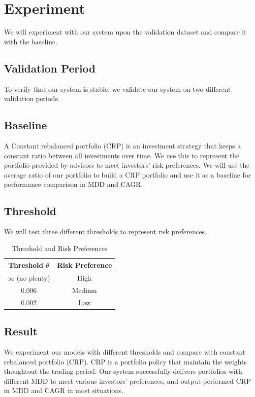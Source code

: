 \section{Experiment}
We will experiment with our system upon the validation dataset and compare it with the baseline.
\subsection{Validation Period}
To verify that our system is stable, we validate our system on two different validation periods. 
\subsection{Baseline}
A Constant rebalanced portfolio (CRP) is an investment strategy that keeps a constant ratio between all investments over time. We use this to represent the portfolio provided by advisors to meet investors' risk preferences. We will use the average ratio of our portfolio to build a CRP portfolio and use it as a baseline for performance comparison in MDD and CAGR.
\subsection{Threshold}
We will test three different thresholds to represent risk preferences.  
\begin{table}[htb]
    \centering
    \begin{tabular}{|c|c|}
    \hline \hline
    Threshold $\theta$ & Risk Preference \\ \hline
    $\infty$  (no plenty) & High \\ \hline
    0.006 & Medium      \\ \hline
    0.002 & Low      \\ \hline    
    \hline \hline
    \end{tabular}
    \caption{Threshold and Risk Preferences}
    \label{tab:threshold}
\end{table}
\subsection{Result}
We experiment our models with different thresholds and compare with constant rebalanced portfolio (CRP). 
CRP is a portfolio policy that maintain the weights thoughtout the trading period. 
Our system successfully delivers portfolios with different MDD to meet various investors' preferences, and output performed CRP in MDD and CAGR in most situations.

